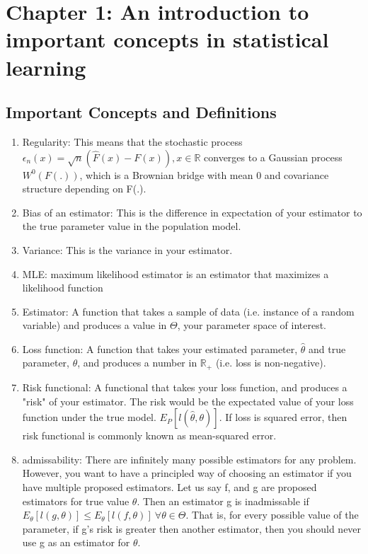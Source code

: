 
\section{Chapter 1: An introduction to important concepts in statistical learning}
  \label{sec:chapterone}
  \subsection{Important Concepts and Definitions}
  	\begin{enumerate}
  		\item Regularity: This means that the stochastic process $\epsilon_n(x) = \sqrt{n} (\hat{F}(x) - F(x)), x \in \mathbb{R}$ converges to a Gaussian process $W^0(F(.))$, which is a Brownian bridge with mean 0 and covariance structure depending on F(.). 
  		\item Bias of an estimator: This is the difference in expectation of your estimator to the true parameter value in the population model.
  		\item Variance: This is the variance in your estimator.
  		\item MLE: maximum likelihood estimator is an estimator that maximizes a likelihood function
  		\item Estimator: A function that takes a sample of data (i.e. instance of a random variable) and produces a value in $\Theta$, your parameter space of interest.
  		\item Loss function: A function that takes your estimated parameter, $\hat{\theta}$ and true parameter, $\theta$, and produces a number in $\mathbb{R}_+$ (i.e. loss is non-negative).
  		\item Risk functional: A functional that takes your loss function, and produces a "risk" of your estimator. The risk would be the expectated value of your loss function under the true model. $E_P [ l(\hat{\theta}, \theta) ]$. If loss is squared error, then risk functional is commonly known as mean-squared error. 
  		\item admissability: There are infinitely many possible estimators for any problem. However, you want to have a principled way of choosing an estimator if you have multiple proposed estimators. Let us say f, and g are proposed estimators for true value $\theta$. Then an estimator g is inadmissable if $E_\theta [ l(g, \theta) ] \le E_\theta [ l(f, \theta) ] \ \forall \theta \in \Theta$. That is, for every possible value of the parameter, if g's risk is greater then another estimator, then you should never use g as an estimator for $\theta$.
  	\end{enumerate}

